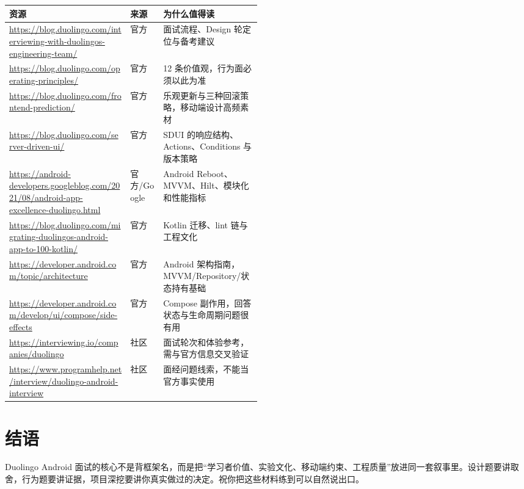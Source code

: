 \begin{center}
\begin{tabularx}{\linewidth}{@{}>{\raggedright\arraybackslash}p{0.48\linewidth} l X@{}}
\toprule
\textbf{资源} & \textbf{来源} & \textbf{为什么值得读} \\
\midrule
\url{https://blog.duolingo.com/interviewing-with-duolingos-engineering-team/} & 官方 & 面试流程、Design 轮定位与备考建议 \\
\url{https://blog.duolingo.com/operating-principles/} & 官方 & 12 条价值观，行为面必须以此为准 \\
\url{https://blog.duolingo.com/frontend-prediction/} & 官方 & 乐观更新与三种回滚策略，移动端设计高频素材 \\
\url{https://blog.duolingo.com/server-driven-ui/} & 官方 & SDUI 的响应结构、Actions、Conditions 与版本策略 \\
\url{https://android-developers.googleblog.com/2021/08/android-app-excellence-duolingo.html} & 官方/Google & Android Reboot、MVVM、Hilt、模块化和性能指标 \\
\url{https://blog.duolingo.com/migrating-duolingos-android-app-to-100-kotlin/} & 官方 & Kotlin 迁移、lint 链与工程文化 \\
\url{https://developer.android.com/topic/architecture} & 官方 & Android 架构指南，MVVM/Repository/状态持有基础 \\
\url{https://developer.android.com/develop/ui/compose/side-effects} & 官方 & Compose 副作用，回答状态与生命周期问题很有用 \\
\url{https://interviewing.io/companies/duolingo} & 社区 & 面试轮次和体验参考，需与官方信息交叉验证 \\
\url{https://www.programhelp.net/interview/duolingo-android-interview} & 社区 & 面经问题线索，不能当官方事实使用 \\
\bottomrule
\end{tabularx}
\end{center}

\section*{结语}

Duolingo Android 面试的核心不是背框架名，而是把“学习者价值、实验文化、移动端约束、工程质量”放进同一套叙事里。设计题要讲取舍，行为题要讲证据，项目深挖要讲你真实做过的决定。祝你把这些材料练到可以自然说出口。
